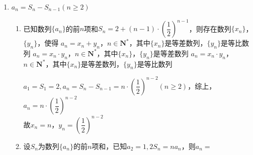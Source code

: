 \begin{enumerate}
\begin{enumerate}
    \end{enumerate}
    \item $a_n = S_n - S_{n-1} (n \geq 2)$
    \begin{enumerate}
        \item 已知数列$\{a_n\}$的前$n$项和$S_n = 2 + (n-1)\cdot \left ( \dfrac{1}{2} \right )^{n-1}$，则存在数列$\{x_n\}$，$\{y_n\}$，使得
        {$a_n = x_n + y_n$，$n \in \mathbf{N^*}$，其中$\{x_n\}$是等差数列，$\{y_n\}$是等比数列}
        {$a_n = x_n \cdot y_n$，$n \in \mathbf{N^*}$，其中$\{x_n\}$，$\{y_n\}$是等差数列}
        {$a_n = x_n \cdot y_n$，$n \in \mathbf{N^*}$，其中$\{x_n\}$是等差数列，$\{y_n\}$是等比数列}
    \begin{jieda}
        $a_1 = S_1 = 2, a_n = S_n - S_{n-1} = n \cdot \left ( \dfrac{1}{2} \right )^{n-2} (n \geq 2)$，综上，$a_n = n \cdot \left ( \dfrac{1}{2} \right )^{n-2}$\\
        故$x_n = n$，$y_n = \left ( \dfrac{1}{2} \right )^{n-2}$
    \end{jieda}
    \item 设$S_n$为数列$\{a_n\}$的前$n$项和，已知$a_2 = 1, 2S_n = na_n$，则$a_n = $
\end{enumerate}
\end{enumerate}
